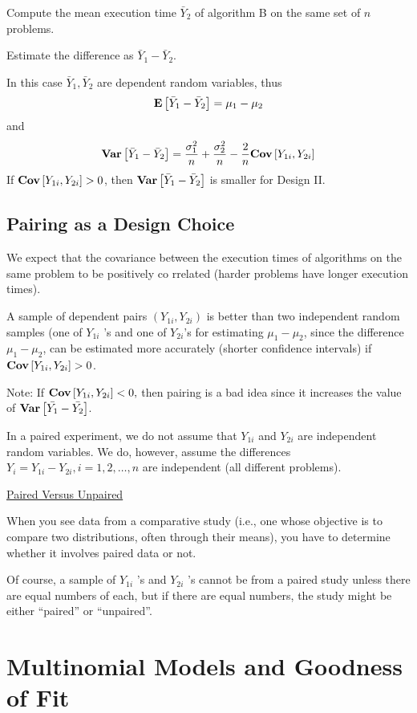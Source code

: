 Compute the mean execution time $\bar{Y}_{2}$ of algorithm B on the same set of $n$ problems.

Estimate the difference as $\bar{Y}_{1}-\bar{Y}_{2}$.

In this case $\bar{Y}_{1}, \bar{Y}_{2}$ are dependent random variables, thus
\[\bm{\mathrm{E}}\left[\bar{Y}_{1}-\bar{Y}_{2}\right]=\mu_{1}-\mu_{2}\]
and
\[\bm{\mathrm{Var}}\left[\bar{Y}_{1}-\bar{Y}_{2}\right]
    =\frac{\sigma_{1}^{2}}{n}+
    \frac{\sigma_{2}^{2}}{n}-\frac{2}{n}
    \bm{\mathrm{Cov}}\left[Y_{1 i}, Y_{2 i}\right]
\]
If $ \bm{\mathrm{Cov}}\left[Y_{1 i}, Y_{2 i}\right]>0$,
then $ \bm{\mathrm{Var}}\left[\bar{Y}_{1}-\bar{Y}_{2}\right]$ is smaller for Design II.

\subsection{Pairing as a Design Choice}

We expect that the covariance between the execution times of algorithms on the same problem to be
positively co rrelated (harder problems have longer execution times).

A sample of dependent pairs $\left(Y_{1 i}, Y_{2 i}\right)$ is better than two
independent random samples (one of $Y_{1 i}$ 's and one of $Y_{2 i}$'s for
estimating $\mu_{1}-\mu_{2}$, since the difference $\mu_{1}-\mu_{2}$,
can be estimated more accurately (shorter confidence intervals)
if $\bm{\mathrm{Cov}}\left[Y_{1 i}, Y_{2 i}\right]>0$.

Note: If $\bm{\mathrm{Cov}}\left[Y_{1 i}, Y_{2 i}\right]<0,$
then pairing is a bad idea since it increases the value of
$\bm{\mathrm{Var}}\left[\bar{Y_{1}}-\bar{Y_{2}}\right]$.

In a paired experiment, we do not
assume that $Y_{1 i}$ and $Y_{2 i}$ are independent random variables.
We do, however, assume the differences $Y_{i}=Y_{1 i}-Y_{2 i}, i=1,2, \ldots, n$
are independent (all different problems).

\underline{Paired Versus Unpaired}

When you see data from a comparative study (i.e., one
whose objective is to compare two distributions, often through their means),
you have to determine whether it involves paired data or not.

Of course, a sample of $Y_{1 i}$ 's and $Y_{2 i}$ 's cannot be
from a paired study unless there are equal numbers of each, but
if there are equal numbers, the study might be either ``paired'' or
``unpaired''.

\section{Multinomial Models and Goodness of Fit}
